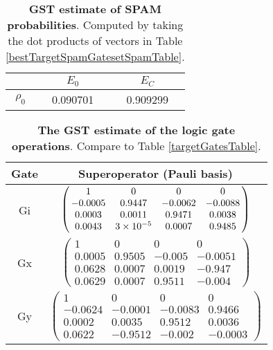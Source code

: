 {\begin{table}[h]
\begin{center}
\begin{tabular}[l]{|c|c|c|}
\hline
 & $E_{0}$ & $E_C$ \\ \hline
$\rho_{0}$ & 0.090701 & 0.909299 \\ \hline
\end{tabular}

\caption{\textbf{GST estimate of SPAM probabilities}.  Computed by taking the dot products of vectors in Table \ref{bestTargetSpamGatesetSpamTable}.\label{bestTargetSpamGatesetSpamParametersTable}}
\end{center}
\end{table}

\begin{table}[h]
\begin{center}
\begin{tabular}[l]{|c|c|}
\hline
Gate & Superoperator (Pauli basis) \\ \hline
Gi & $ \left(\!\!\begin{array}{cccc}
1 & 0 & 0 & 0 \\ 
-0.0005 & 0.9447 & -0.0062 & -0.0088 \\ 
0.0003 & 0.0011 & 0.9471 & 0.0038 \\ 
0.0043 & 3\times 10^{-5} & 0.0007 & 0.9485
 \end{array}\!\!\right) $
 \\ \hline
Gx & $ \left(\!\!\begin{array}{cccc}
1 & 0 & 0 & 0 \\ 
0.0005 & 0.9505 & -0.005 & -0.0051 \\ 
0.0628 & 0.0007 & 0.0019 & -0.947 \\ 
0.0629 & 0.0007 & 0.9511 & -0.004
 \end{array}\!\!\right) $
 \\ \hline
Gy & $ \left(\!\!\begin{array}{cccc}
1 & 0 & 0 & 0 \\ 
-0.0624 & -0.0001 & -0.0083 & 0.9466 \\ 
0.0002 & 0.0035 & 0.9512 & 0.0036 \\ 
0.0622 & -0.9512 & -0.002 & -0.0003
 \end{array}\!\!\right) $
 \\ \hline
\end{tabular}

\caption{\textbf{The GST estimate of the logic gate operations}.  Compare to Table \ref{targetGatesTable}.\label{bestTargetSpamGatesetGatesTable}}
\end{center}
\end{table}

}
